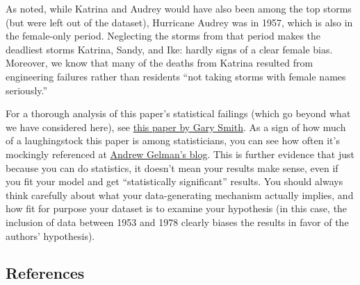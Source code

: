 \documentclass[
  letterpaper,
  DIV=11,
  numbers=noendperiod]{scrartcl}
\begin{document}
As noted, while Katrina and Audrey would have also been among the top
storms (but were left out of the dataset), Hurricane Audrey was in 1957,
which is also in the female-only period. Neglecting the storms from that
period makes the deadliest storms Katrina, Sandy, and Ike: hardly signs
of a clear female bias. Moreover, we know that many of the deaths from
Katrina resulted from engineering failures rather than residents ``not
taking storms with female names seriously.''

For a thorough analysis of this paper's statistical failings (which go
beyond what we have considered here), see
\href{https://www.sciencedirect.com/science/article/pii/S2212094715300517}{this
paper by Gary Smith}. As a sign of how much of a laughingstock this
paper is among statisticians, you can see how often it's mockingly
referenced at
\href{https://statmodeling.stat.columbia.edu/?s=himmicanes&submit=Search}{Andrew
Gelman's blog}. This is further evidence that just because you can do
statistics, it doesn't mean your results make sense, even if you fit
your model and get ``statistically significant'' results. You should
always think carefully about what your data-generating mechanism
actually implies, and how fit for purpose your dataset is to examine
your hypothesis (in this case, the inclusion of data between 1953 and
1978 clearly biases the results in favor of the authors' hypothesis).

\subsection{References}\label{references}
\end{document}
